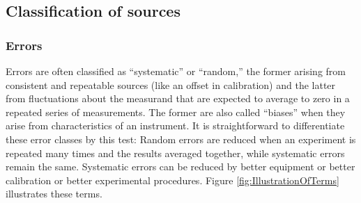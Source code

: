 \documentclass[12pt,twoside,english]{article}\usepackage[]{graphicx}\usepackage[]{color}
\let\OrgIndex\index
\renewcommand*{\index}[1]{\OrgIndex{#1}}
\begin{document}
\subsection{Classification of sources}
\subsubsection{Errors}

\label{sec:Classification-of-sources}Errors are often classified as ``systematic'' or ``random,'' the former arising from consistent and repeatable sources (like an offset in calibration) and the latter from fluctuations about the measurand that are expected to average to zero in a repeated series of measurements. The former are also called ``biases'' when they arise from characteristics of an instrument. It is straightforward to differentiate these error classes by this test: Random errors are reduced when an experiment is repeated many times and the results averaged together, while systematic errors remain the same. Systematic errors can be reduced by better equipment or better calibration or better experimental procedures. Figure \ref{fig:IllustrationOfTerms} illustrates these terms. 
\end{document}

